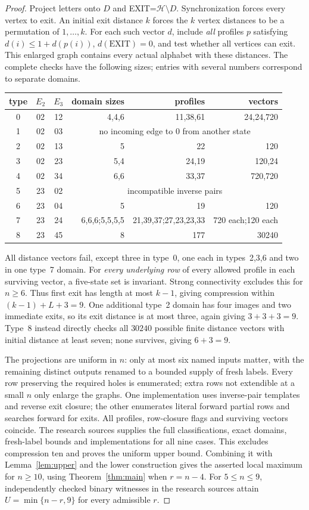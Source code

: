 \documentclass[10pt]{article}
\begin{document}
\begin{proof}
Project letters onto $D$ and EXIT=$\mathcal H\setminus D$.
Synchronization forces every vertex to exit. An initial exit distance
$k$ forces the $k$ vertex distances to be a permutation of $1,\ldots,k$.
For each such vector $d$, include \emph{all} profiles $p$ satisfying
$d(i)\le1+d(p(i))$, $d(\mathrm{EXIT})=0$, and test whether all vertices can
exit. This enlarged graph contains every actual alphabet with these
distances. The complete checks have the following sizes; entries with
several numbers correspond to separate domains.
\begin{center}\small
\begin{tabular}{cccrrr}
 type&$E_2$&$E_3$&domain sizes&profiles&vectors\\ \hline
 0&02&12&4,4,6&11,38,61&24,24,720\\
 1&02&03&\multicolumn{3}{c}{no incoming edge to 0 from another state}\\
 2&02&13&5&22&120\\
 3&02&23&5,4&24,19&120,24\\
 4&02&34&6,6&33,37&720,720\\
 5&23&02&\multicolumn{3}{c}{incompatible inverse pairs}\\
 6&23&04&5&19&120\\
 7&23&24&6,6,6;5,5,5,5&21,39,37;27,23,23,33&720 each;120 each\\
 8&23&45&8&177&30240
\end{tabular}
\end{center}
All distance vectors fail, except three in type~0, one each in
types~2,3,6 and two in one type~7 domain.
For \emph{every underlying row} of every allowed profile in each surviving
vector, a five-state set is invariant. Strong connectivity excludes
this for $n\ge6$. Thus first exit has length at most $k-1$, giving
compression within $(k-1)+L+3=9$.
One additional type~2 domain has four images and two immediate exits,
so its exit distance is at most three, again giving $3+3+3=9$.
Type~8 instead directly checks all $30240$ possible finite distance
vectors with initial distance at least seven; none survives, giving
$6+3=9$.

The projections are uniform in $n$: only at most six named inputs
matter, with the remaining distinct outputs renamed to a bounded supply
of fresh labels. Every row preserving the required holes is enumerated;
extra rows not extendible at a small $n$ only enlarge the graphs.
One implementation uses inverse-pair templates and reverse exit closure;
the other enumerates literal forward partial rows and searches forward
for exits. All profiles, row-closure flags and surviving vectors coincide.
The research sources supplies the full classifications, exact domains,
fresh-label bounds and implementations for all nine cases.
This excludes compression ten and proves the uniform upper bound.
Combining it with Lemma~\ref{lem:upper} and the lower construction gives
the asserted local maximum for $n\ge10$, using Theorem~\ref{thm:main}
when $r=n-4$. For $5\le n\le9$, independently checked binary witnesses
in the research sources attain $U=\min\{n-r,9\}$ for every admissible $r$.
\end{proof}
\end{document}
